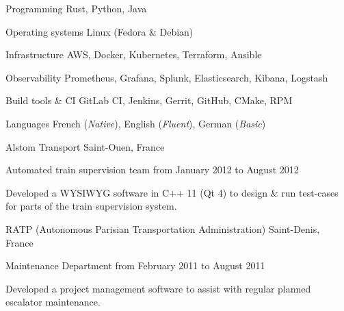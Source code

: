 \documentclass[10pt, a4paper]{awesome-cv}
\begin{document}
\begin{cvskills}
	\cvskill
	{Programming}
	{Rust, Python, Java}

	\cvskill
	{Operating systems}
	{Linux (Fedora \& Debian)}

	\cvskill
	{Infrastructure}
	{AWS, Docker, Kubernetes, Terraform, Ansible}

	\cvskill
	{Observability}
	{Prometheus, Grafana, Splunk, Elasticsearch, Kibana, Logstash}

	\cvskill
	{Build tools \& CI}
	{GitLab CI, Jenkins, Gerrit, GitHub, CMake, RPM}

	\cvskill
	{Languages}
	{French (\emph{Native}), English (\emph{Fluent}), German (\emph{Basic})}
\end{cvskills}

\newpage
{}


\begin{cventries}

	\cventrytitle
	{Alstom Transport}
	{Saint-Ouen, France}

	\cventry
	{Automated train supervision team}
	{from January 2012 to August 2012}
	{
		\begin{cvparagraph}
			Developed a WYSIWYG software in C++ 11 (Qt 4) to design \& run test-cases for parts of the train supervision system.
		\end{cvparagraph}
		\vspace{4pt}
	}

	\cventrytitle
	{RATP (Autonomous Parisian Transportation Administration)}
	{Saint-Denis, France}

	\cventry
	{Maintenance Department}
	{from February 2011 to August 2011}
	{
		\begin{cvparagraph}
			Developed a project management software to assist with regular planned escalator maintenance.
		\end{cvparagraph}
	}

\end{cventries}

\end{document}
